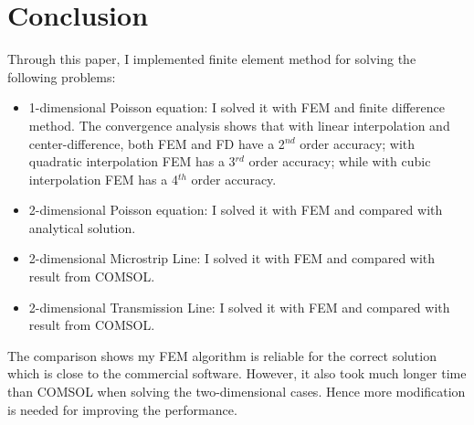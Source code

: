 \documentclass[journal]{IEEEtran}
\begin{document}




\section{Conclusion}
Through this paper, I implemented finite element method for solving the following problems: 
\begin{itemize}
	\item 1-dimensional Poisson equation: I solved it with FEM and finite difference method. The convergence analysis shows that with linear interpolation and center-difference, both FEM and FD have a 2$^{nd}$ order accuracy; with quadratic interpolation FEM has a 3$^{rd}$ order accuracy; while with cubic interpolation FEM has a 4$^{th}$ order accuracy.
	\item 2-dimensional Poisson equation: I solved it with FEM and compared with analytical solution. 
	\item 2-dimensional Microstrip Line: I solved it with FEM and compared with result from COMSOL.
	\item 2-dimensional Transmission Line: I solved it with FEM and compared with result from COMSOL.
\end{itemize}
The comparison shows my FEM algorithm is reliable for the correct solution which is close to the commercial software. However, it also took much longer time than COMSOL when solving the two-dimensional cases. Hence more modification is needed for improving the performance.

\end{document}
